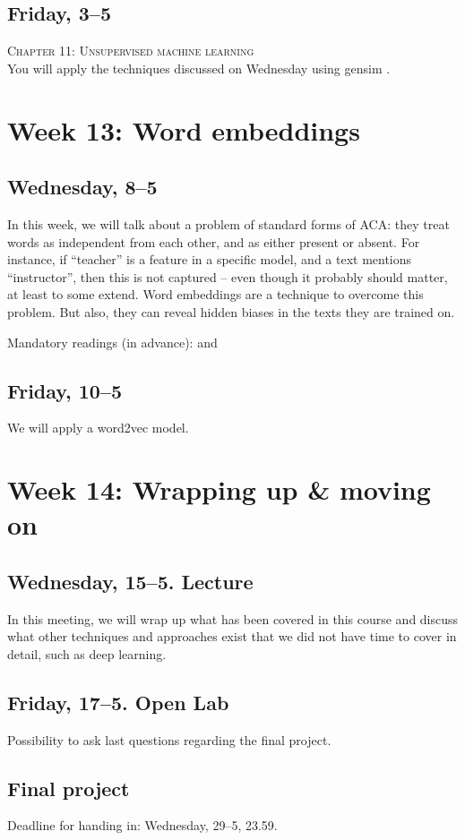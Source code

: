 \subsection*{Friday, 3--5}
\textsc{ Chapter 11: Unsupervised machine learning}\\
You will apply the techniques discussed on Wednesday using gensim \citep{Rehurek2010}.



\section*{Week 13: Word embeddings}

\subsection*{Wednesday, 8--5}
In this week, we will talk about a problem of standard forms of ACA: they treat words as independent from each other, and as either present or absent. For instance, if ``teacher'' is a feature in a specific model, and a text mentions ``instructor'', then this is not captured -- even though it probably should matter, at least to some extend. Word embeddings are a technique to overcome this problem. But also, they can reveal hidden biases in the texts they are trained on.

Mandatory readings (in advance): \cite{Kusner2015} and \cite{Garg2017}



\subsection*{Friday, 10--5}
We will apply a word2vec model.



\section*{Week 14: Wrapping up \& moving on}

\subsection*{Wednesday, 15--5. Lecture}
In this meeting, we will wrap up what has been covered in this course and discuss what other techniques and approaches exist that we did not have time to cover in detail, such as deep learning. 

\subsection*{Friday, 17--5. Open Lab}
Possibility to ask last questions regarding the final project.

\subsection*{Final project}
Deadline for handing in: Wednesday, 29--5, 23.59.